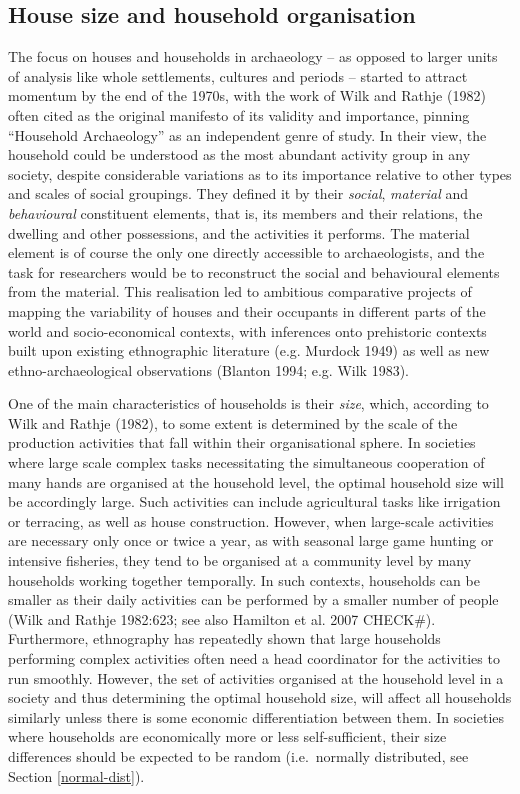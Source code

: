 \documentclass[
  12pt,
]{book}
\begin{document}
\hypertarget{house-size-and-household-organisation}{%
\subsection{House size and household organisation}\label{house-size-and-household-organisation}}

The focus on houses and households in archaeology -- as opposed to larger units of analysis like whole settlements, cultures and periods -- started to attract momentum by the end of the 1970s, with the work of Wilk and Rathje (1982) often cited as the original manifesto of its validity and importance, pinning ``Household Archaeology'' as an independent genre of study. In their view, the household could be understood as the most abundant activity group in any society, despite considerable variations as to its importance relative to other types and scales of social groupings. They defined it by their \emph{social}, \emph{material} and \emph{behavioural} constituent elements, that is, its members and their relations, the dwelling and other possessions, and the activities it performs. The material element is of course the only one directly accessible to archaeologists, and the task for researchers would be to reconstruct the social and behavioural elements from the material. This realisation led to ambitious comparative projects of mapping the variability of houses and their occupants in different parts of the world and socio-economical contexts, with inferences onto prehistoric contexts built upon existing ethnographic literature (e.g. Murdock 1949) as well as new ethno-archaeological observations (Blanton 1994; e.g. Wilk 1983).

One of the main characteristics of households is their \emph{size}, which, according to Wilk and Rathje (1982), to some extent is determined by the scale of the production activities that fall within their organisational sphere. In societies where large scale complex tasks necessitating the simultaneous cooperation of many hands are organised at the household level, the optimal household size will be accordingly large. Such activities can include agricultural tasks like irrigation or terracing, as well as house construction. However, when large-scale activities are necessary only once or twice a year, as with seasonal large game hunting or intensive fisheries, they tend to be organised at a community level by many households working together temporally. In such contexts, households can be smaller as their daily activities can be performed by a smaller number of people (Wilk and Rathje 1982:623; see also Hamilton et al. 2007 CHECK\#). Furthermore, ethnography has repeatedly shown that large households performing complex activities often need a head coordinator for the activities to run smoothly. However, the set of activities organised at the household level in a society and thus determining the optimal household size, will affect all households similarly unless there is some economic differentiation between them. In societies where households are economically more or less self-sufficient, their size differences should be expected to be random (i.e.~normally distributed, see Section \ref{normal-dist}).
\end{document}
